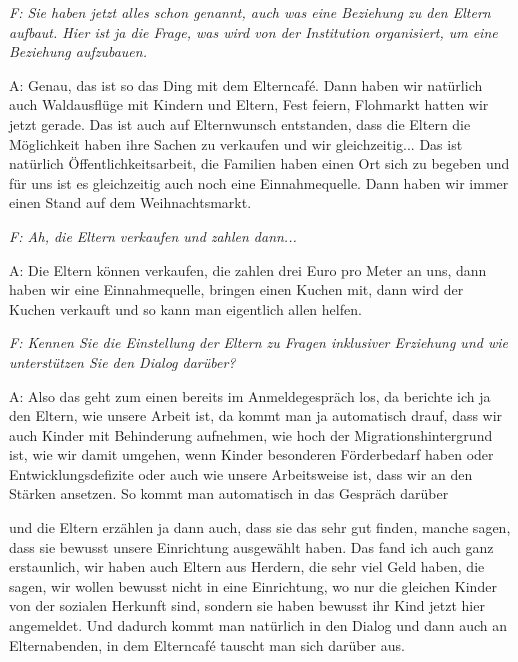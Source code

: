 \begin{linenumbers*}
\emph{F:  Sie haben jetzt alles schon genannt, auch was eine Beziehung zu den Eltern aufbaut.  
Hier ist ja die Frage, was wird von der Institution organisiert, um eine Beziehung aufzubauen.}

A:  Genau, das ist so das Ding mit dem Elterncafé. Dann haben wir natürlich auch Waldausflüge mit Kindern und Eltern, Fest feiern, Flohmarkt hatten wir jetzt gerade. Das ist auch auf Elternwunsch entstanden, dass die Eltern die Möglichkeit haben ihre Sachen zu verkaufen und wir gleichzeitig... Das ist natürlich Öffentlichkeitsarbeit, die Familien haben einen Ort sich zu begeben und für uns ist es gleichzeitig auch noch eine Einnahmequelle. Dann haben wir immer einen Stand auf dem Weihnachtsmarkt. 

\emph{F: Ah, die Eltern verkaufen und zahlen dann...}

A:  Die Eltern können verkaufen, die zahlen drei Euro pro Meter an uns, dann haben wir eine Einnahmequelle, bringen einen Kuchen mit, dann wird der Kuchen verkauft und so kann man eigentlich allen helfen. 

\emph{F: Kennen Sie die Einstellung der Eltern zu Fragen inklusiver Erziehung und wie unterstützen Sie den Dialog darüber?}

A: Also das geht zum einen bereits im Anmeldegespräch los, da berichte ich ja den Eltern, wie unsere Arbeit ist, da kommt man ja automatisch drauf, dass wir auch Kinder mit Behinderung aufnehmen, wie hoch der Migrationshintergrund ist, wie wir damit umgehen, wenn Kinder besonderen Förderbedarf haben oder Entwicklungsdefizite oder auch wie unsere Arbeitsweise ist, dass wir an den Stärken ansetzen. So kommt man automatisch in das Gespräch darüber 

und die Eltern erzählen ja dann auch, dass sie das sehr gut finden, 
manche sagen, dass sie bewusst unsere Einrichtung ausgewählt haben. 
Das fand ich auch ganz erstaunlich, wir haben auch Eltern aus Herdern, die sehr viel Geld haben, die sagen, wir wollen bewusst nicht in eine Einrichtung, wo nur die gleichen Kinder von der sozialen Herkunft sind, sondern sie haben bewusst ihr Kind jetzt hier angemeldet. 
Und dadurch kommt man natürlich in den Dialog und dann auch an Elternabenden, in dem Elterncafé tauscht man sich darüber aus. 


\end{linenumbers*}
